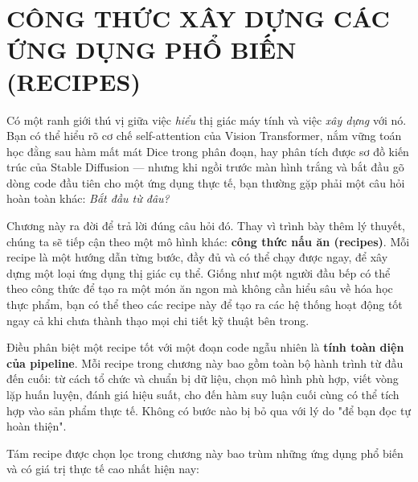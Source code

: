 \chapter{CÔNG THỨC XÂY DỰNG CÁC ỨNG DỤNG PHỔ BIẾN (RECIPES)}
\label{chap:p2_recipes}

Có một ranh giới thú vị giữa việc \textit{hiểu} thị giác máy tính và việc \textit{xây dựng} với nó. Bạn có thể hiểu rõ cơ chế self-attention của Vision Transformer, nắm vững toán học đằng sau hàm mất mát Dice trong phân đoạn, hay phân tích được sơ đồ kiến trúc của Stable Diffusion --- nhưng khi ngồi trước màn hình trắng và bắt đầu gõ dòng code đầu tiên cho một ứng dụng thực tế, bạn thường gặp phải một câu hỏi hoàn toàn khác: \textit{Bắt đầu từ đâu?}

Chương này ra đời để trả lời đúng câu hỏi đó. Thay vì trình bày thêm lý thuyết, chúng ta sẽ tiếp cận theo một mô hình khác: \textbf{công thức nấu ăn (recipes)}. Mỗi recipe là một hướng dẫn từng bước, đầy đủ và có thể chạy được ngay, để xây dựng một loại ứng dụng thị giác cụ thể. Giống như một người đầu bếp có thể theo công thức để tạo ra một món ăn ngon mà không cần hiểu sâu về hóa học thực phẩm, bạn có thể theo các recipe này để tạo ra các hệ thống hoạt động tốt ngay cả khi chưa thành thạo mọi chi tiết kỹ thuật bên trong.

Điều phân biệt một recipe tốt với một đoạn code ngẫu nhiên là \textbf{tính toàn diện của pipeline}. Mỗi recipe trong chương này bao gồm toàn bộ hành trình từ đầu đến cuối: từ cách tổ chức và chuẩn bị dữ liệu, chọn mô hình phù hợp, viết vòng lặp huấn luyện, đánh giá hiệu suất, cho đến hàm suy luận cuối cùng có thể tích hợp vào sản phẩm thực tế. Không có bước nào bị bỏ qua với lý do "để bạn đọc tự hoàn thiện".

Tám recipe được chọn lọc trong chương này bao trùm những ứng dụng phổ biến và có giá trị thực tế cao nhất hiện nay:

